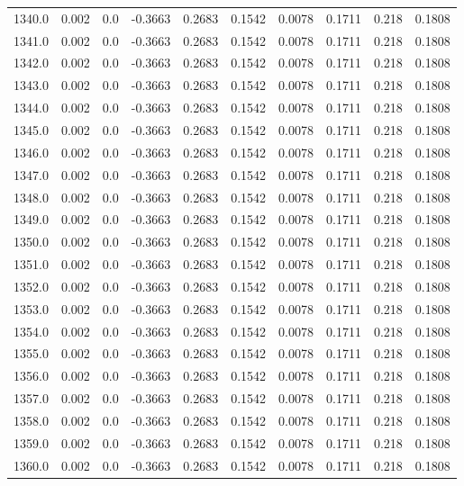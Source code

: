 \begin{longtable}{lrrrrrrrrr}
1340.0 & 0.002 & 0.0 & -0.3663 & 0.2683 & 0.1542 & 0.0078 & 0.1711 & 0.218 & 0.1808 \\
1341.0 & 0.002 & 0.0 & -0.3663 & 0.2683 & 0.1542 & 0.0078 & 0.1711 & 0.218 & 0.1808 \\
1342.0 & 0.002 & 0.0 & -0.3663 & 0.2683 & 0.1542 & 0.0078 & 0.1711 & 0.218 & 0.1808 \\
1343.0 & 0.002 & 0.0 & -0.3663 & 0.2683 & 0.1542 & 0.0078 & 0.1711 & 0.218 & 0.1808 \\
1344.0 & 0.002 & 0.0 & -0.3663 & 0.2683 & 0.1542 & 0.0078 & 0.1711 & 0.218 & 0.1808 \\
1345.0 & 0.002 & 0.0 & -0.3663 & 0.2683 & 0.1542 & 0.0078 & 0.1711 & 0.218 & 0.1808 \\
1346.0 & 0.002 & 0.0 & -0.3663 & 0.2683 & 0.1542 & 0.0078 & 0.1711 & 0.218 & 0.1808 \\
1347.0 & 0.002 & 0.0 & -0.3663 & 0.2683 & 0.1542 & 0.0078 & 0.1711 & 0.218 & 0.1808 \\
1348.0 & 0.002 & 0.0 & -0.3663 & 0.2683 & 0.1542 & 0.0078 & 0.1711 & 0.218 & 0.1808 \\
1349.0 & 0.002 & 0.0 & -0.3663 & 0.2683 & 0.1542 & 0.0078 & 0.1711 & 0.218 & 0.1808 \\
1350.0 & 0.002 & 0.0 & -0.3663 & 0.2683 & 0.1542 & 0.0078 & 0.1711 & 0.218 & 0.1808 \\
1351.0 & 0.002 & 0.0 & -0.3663 & 0.2683 & 0.1542 & 0.0078 & 0.1711 & 0.218 & 0.1808 \\
1352.0 & 0.002 & 0.0 & -0.3663 & 0.2683 & 0.1542 & 0.0078 & 0.1711 & 0.218 & 0.1808 \\
1353.0 & 0.002 & 0.0 & -0.3663 & 0.2683 & 0.1542 & 0.0078 & 0.1711 & 0.218 & 0.1808 \\
1354.0 & 0.002 & 0.0 & -0.3663 & 0.2683 & 0.1542 & 0.0078 & 0.1711 & 0.218 & 0.1808 \\
1355.0 & 0.002 & 0.0 & -0.3663 & 0.2683 & 0.1542 & 0.0078 & 0.1711 & 0.218 & 0.1808 \\
1356.0 & 0.002 & 0.0 & -0.3663 & 0.2683 & 0.1542 & 0.0078 & 0.1711 & 0.218 & 0.1808 \\
1357.0 & 0.002 & 0.0 & -0.3663 & 0.2683 & 0.1542 & 0.0078 & 0.1711 & 0.218 & 0.1808 \\
1358.0 & 0.002 & 0.0 & -0.3663 & 0.2683 & 0.1542 & 0.0078 & 0.1711 & 0.218 & 0.1808 \\
1359.0 & 0.002 & 0.0 & -0.3663 & 0.2683 & 0.1542 & 0.0078 & 0.1711 & 0.218 & 0.1808 \\
1360.0 & 0.002 & 0.0 & -0.3663 & 0.2683 & 0.1542 & 0.0078 & 0.1711 & 0.218 & 0.1808 \\

\end{longtable}
